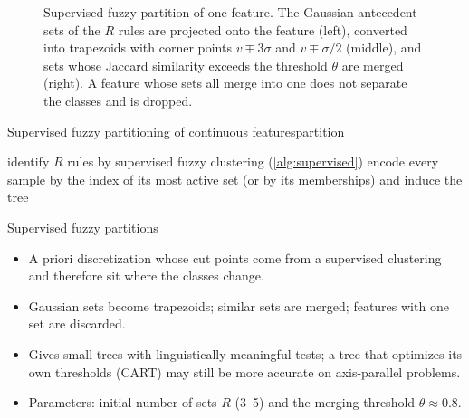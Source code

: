 \begin{figure}[htbp]
\caption[Supervised fuzzy partition of one feature.]{Supervised fuzzy partition of one feature. The Gaussian antecedent sets of the $R$ rules are projected onto the feature (left), converted into trapezoids with corner points $v\mp3\sigma$ and $v\mp\sigma/2$ (middle), and sets whose Jaccard similarity exceeds the threshold $\theta$ are merged (right). A feature whose sets all merge into one does not separate the classes and is dropped.}
\label{fig:models:partition}
\end{figure}

\begin{algobox}{Supervised fuzzy partitioning of continuous features}{partition}
\begin{algorithm}[H]
identify $R$ rules by supervised fuzzy clustering (\cref{alg:supervised})\;
encode every sample by the index of its most active set (or by its memberships) and induce the tree\;
\end{algorithm}
\end{algobox}
\begin{summarybox}{Supervised fuzzy partitions}
\begin{itemize}
  \item A priori discretization whose cut points come from a supervised clustering and therefore sit where the classes change.
  \item Gaussian sets become trapezoids; similar sets are merged; features with one set are discarded.
  \item Gives small trees with linguistically meaningful tests; a tree that optimizes its own thresholds (CART) may still be more accurate on axis-parallel problems.
  \item Parameters: initial number of sets $R$ (3--5) and the merging threshold $\theta\approx0.8$.
\end{itemize}
\end{summarybox}

